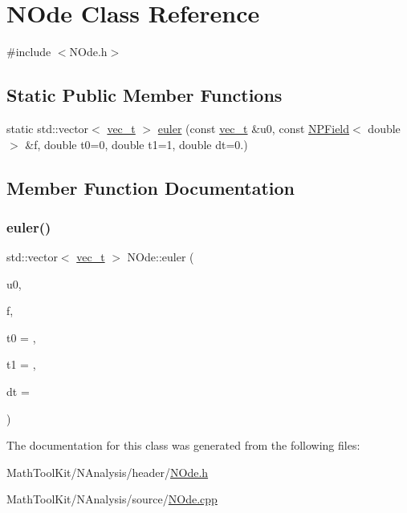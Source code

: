 \hypertarget{class_n_ode}{}\section{N\+Ode Class Reference}
\label{class_n_ode}


{\ttfamily \#include $<$N\+Ode.\+h$>$}

\subsection*{Static Public Member Functions}
\begin{DoxyCompactItemize}
\item 
static std\+::vector$<$ \mbox{\hyperlink{_n_vector_8h_a0a2cfc67e738a3d73e4f12098c4c07f6}{vec\+\_\+t}} $>$ \mbox{\hyperlink{class_n_ode_aba64ed3eb2ec85a138556d57fc20cdfd}{euler}} (const \mbox{\hyperlink{_n_vector_8h_a0a2cfc67e738a3d73e4f12098c4c07f6}{vec\+\_\+t}} \&u0, const \mbox{\hyperlink{class_n_p_field}{N\+P\+Field}}$<$ double $>$ \&f, double t0=0, double t1=1, double dt=0.)
\end{DoxyCompactItemize}


\subsection{Member Function Documentation}
\mbox{\label{class_n_ode_aba64ed3eb2ec85a138556d57fc20cdfd}} 
\subsubsection{\texorpdfstring{euler()}{euler()}}
{\footnotesize\ttfamily std\+::vector$<$ \mbox{\hyperlink{_n_vector_8h_a0a2cfc67e738a3d73e4f12098c4c07f6}{vec\+\_\+t}} $>$ N\+Ode\+::euler (\begin{DoxyParamCaption}\item[{const \mbox{\hyperlink{_n_vector_8h_a0a2cfc67e738a3d73e4f12098c4c07f6}{vec\+\_\+t}} \&}]{u0,  }\item[{const \mbox{\hyperlink{class_n_p_field}{N\+P\+Field}}$<$ double $>$ \&}]{f,  }\item[{double}]{t0 = {},  }\item[{double}]{t1 = {},  }\item[{double}]{dt = {} }\end{DoxyParamCaption})\hspace{0.3cm}{\ttfamily [static]}}



The documentation for this class was generated from the following files\+:\begin{DoxyCompactItemize}
\item 
Math\+Tool\+Kit/\+N\+Analysis/header/\mbox{\hyperlink{_n_ode_8h}{N\+Ode.\+h}}\item 
Math\+Tool\+Kit/\+N\+Analysis/source/\mbox{\hyperlink{_n_ode_8cpp}{N\+Ode.\+cpp}}\end{DoxyCompactItemize}
